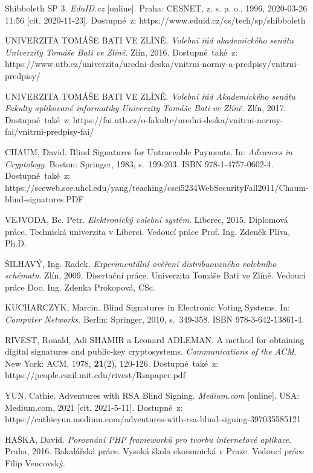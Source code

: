 Shibboleth SP 3. \textit{EduID.cz} [online]. Praha: CESNET, z. s. p. o., 1996, 2020-03-26 11:56 [cit. 2020-11-23]. Dostupné~z: https://www.eduid.cz/cs/tech/sp/shibboleth

UNIVERZITA TOMÁŠE BATI VE ZLÍNĚ. \textit{Volební řád akademického senátu Univerzity Tomáše Bati ve Zlíně}. Zlín, 2016. Dostupné~také~z: https://www.utb.cz/univerzita/uredni-deska/vnitrni-normy-a-predpisy/vnitrni-predpisy/

UNIVERZITA TOMÁŠE BATI VE ZLÍNĚ. \textit{Volební řád Akademického senátu Fakulty aplikované informatiky Univerzity Tomáše Bati ve Zlíně}. Zlín, 2017. Dostupné~také~z: https://fai.utb.cz/o-fakulte/uredni-deska/vnitrni-normy-fai/vnitrni-predpisy-fai/

CHAUM, David. Blind Signatures for Untraceable Payments. In: \textit{Advances in Cryptology}. Boston: Springer, 1983, s.~199-203. ISBN 978-1-4757-0602-4. Dostupné~také~z: https://sceweb.sce.uhcl.edu/yang/teaching/csci5234WebSecurityFall2011/Chaum-blind-signatures.PDF

VEJVODA, Bc. Petr. \textit{Elektronický volební systém}. Liberec, 2015. Diplomová práce. Technická univerzita v Liberci. Vedoucí práce Prof. Ing. Zdeněk Plíva, Ph.D.

ŠILHAVÝ, Ing. Radek. \textit{Experimentální ověření distribuovaného volebního schématu}. Zlín, 2009. Disertační práce. Univerzita Tomáše Bati ve Zlíně. Vedoucí práce Doc. Ing. Zdenka Prokopová, CSc.

KUCHARCZYK, Marcin. Blind Signatures in Electronic Voting Systems. In: \textit{Computer Networks}. Berlin: Springer, 2010, s.~349-358. ISBN 978-3-642-13861-4.

RIVEST, Ronald, Adi SHAMIR a Leonard ADLEMAN. A method for obtaining digital signatures and public-key cryptosystems. \textit{Communications of the ACM}. New York: ACM, 1978, \textbf{21}(2), 120-126. Dostupné~také~z: https://people.csail.mit.edu/rivest/Rsapaper.pdf

YUN, Cathie. Adventures with RSA Blind Signing. \textit{Medium.com} [online]. USA: Medium.com, 2021 [cit. 2021-5-11]. Dostupné~z: https://cathieyun.medium.com/adventures-with-rsa-blind-signing-397035585121

HAŠKA, David. \textit{Porovnání PHP frameworků pro tvorbu internetové aplikace}. Praha, 2016. Bakalářská práce. Vysoká škola ekonomická v Praze. Vedoucí práce Filip Vencovský.

